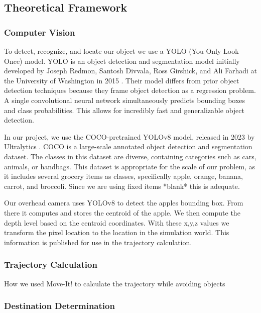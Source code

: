 \documentclass{article}
\begin{document}
\subsection{Theoretical Framework}

\subsubsection{Computer Vision}

To detect, recognize, and locate our object we use a YOLO (You Only Look Once) model. YOLO is an object detection and segmentation model initially developed by Joseph Redmon, Santosh Divvala, Ross Girshick, and Ali Farhadi at the University of Washington in 2015 \cite{DBLP:journals/corr/RedmonDGF15}. Their model differs from prior object detection techniques because they frame  object detection as a regression problem. A single convolutional neural network simultaneously predicts bounding boxes and class probabilities. This allows for incredibly fast and generalizable object detection.


In our project, we use the COCO-pretrained YOLOv8 model, released in 2023 by Ultralytics \cite{yolov8_ultralytics}. COCO is a large-scale annotated object detection and segmentation dataset. The classes in this dataset are diverse, containing categories such as cars, animals, or handbags. This dataset is appropriate for the scale of our problem, as it includes several grocery items as classes, specifically apple, orange, banana, carrot, and broccoli. Since we are using fixed items *blank* this is adequate.

Our overhead camera uses YOLOv8 to detect the apples bounding box. From there it computes and stores the centroid of the apple. We then compute the depth level based on the centroid coordinates. With these x,y,z values we transform the pixel location to the location in the simulation world. This information is published for use in the trajectory calculation.
\subsubsection{Trajectory Calculation}

How we used Move-It! to calculate the trajectory while avoiding objects

\subsubsection{Destination Determination}
\end{document}

